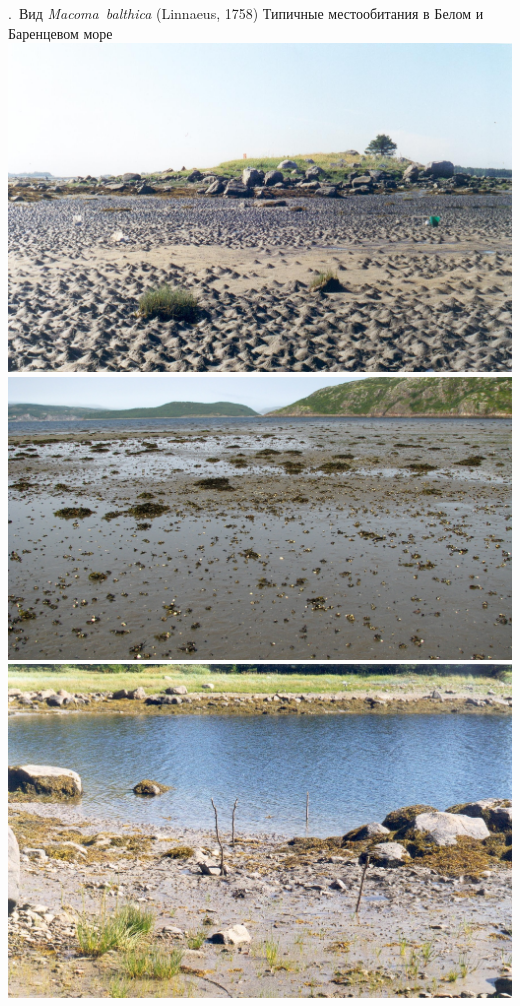 \documentclass[aspectratio=169, xcolor=table]{beamer}
\begin{document}
\begin{frame}{\insertpagenumber.\ Вид {\it Macoma~balthica} (Linnaeus, 1758)}
{\scriptsize Типичные местообитания в Белом и Баренцевом море}
			\includegraphics[height=.3\textheight]{Luvenga_Estuary.JPG}	\includegraphics[height=.3\textheight]{Ura.JPG} \includegraphics[height=.3\textheight]{Goreliy.JPG} %


\end{frame}
\end{document}
